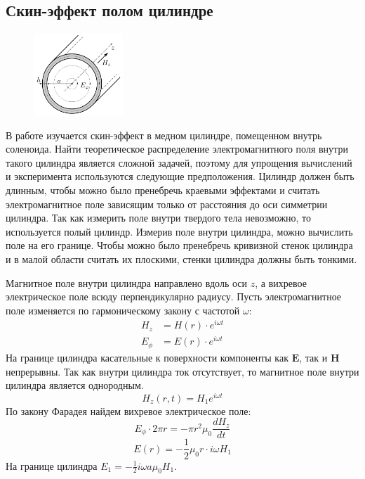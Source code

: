 \subsection*{Скин-эффект полом цилиндре}

\begin{figure}
	\vspace{-10pt}
	\centering
	\includegraphics[width=0.3\textwidth]{../res/pipe.png}
	\caption{}
	\label{fig:pipe}
\end{figure}

В работе изучается скин-эффект в медном цилиндре, помещенном внутрь соленоида. Найти теоретическое распределение электромагнитного поля внутри такого цилиндра является сложной задачей, поэтому для упрощения вычислений и эксперимента используются следующие предположения. Цилиндр должен быть длинным, чтобы можно было пренебречь краевыми эффектами и считать электромагнитное поле зависящим только от расстояния до оси симметрии цилиндра. Так как измерить поле внутри твердого тела невозможно, то используется полый цилиндр. Измерив поле внутри цилиндра, можно вычислить поле на его границе. Чтобы можно было пренебречь кривизной стенок цилиндра и в малой области считать их плоскими, стенки цилиндра должны быть тонкими.

Магнитное поле внутри цилиндра направлено вдоль оси $z$, а вихревое электрическое поле всюду перпендикулярно радиусу. Пусть электромагнитное поле изменяется по гармоническому закону с частотой $\omega$:
\begin{equation*}
	\begin{split}
		H_z &= H(r) \cdot e^{i\omega t} \\
		E_{\phi} &= E(r) \cdot e^{i \omega t}
	\end{split}
\end{equation*}
На границе цилиндра касательные к поверхности компоненты как $\pmb{E}$, так и $\pmb{H}$ непрерывны. Так как внутри цилиндра ток отсутствует, то магнитное поле внутри цилиндра является однородным.
$$
H_z(r, t) = H_1 e^{i \omega t}
$$
По закону Фарадея найдем вихревое электрическое поле:
$$
E_{\phi} \cdot 2\pi r = - \pi r^2 \mu_0 \frac{d H_z}{dt} 
$$
$$
E(r) = -\frac{1}{2} \mu_0 r \cdot i\omega H_1
$$
На границе цилиндра $E_1 = -\frac{1}{2} i \omega a \mu_0 H_1$.

